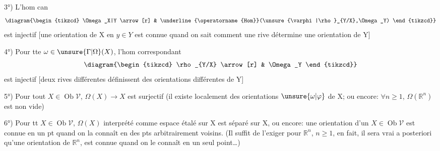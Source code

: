 
3°) L'hom can
\[
\diagram{\begin{tikzcd}
\Omega_X|Y \arrow[r] & \underline{\operatorname{Hom}}(\unsure{\varphi|\rho}_{Y/X},\Omega_Y)
\end{tikzcd}}
\]
est injectif [une orientation de X en $y\in Y$ est connue quand on sait comment  une rive  détermine une orientation de Y]

4°) Pour tte $\omega\in\unsure{\Gamma|\Omega}(X)$, l'hom correspondant
\[
\diagram{\begin{tikzcd}
\rho_{Y/X} \arrow[r] & \Omega_Y
\end{tikzcd}}
\]
est injectif [deux rives différentes définissent des orientations différentes de Y]

5°) Pour tout $X\in\operatorname{Ob}\mathcal V$, $\Omega(X)\to X$ est surjectif (il existe localement des orientations $\unsure{\omega|\varphi}$ de X; ou encore:
$\forall n\geq1$, $\Omega(\mathbb R^n)$ est non vide)

6°) Pour tt $X\in\operatorname{Ob}\mathcal V$, $\Omega(X)$ interprété comme espace étalé sur X est séparé sur X, ou encore:
une orientation d'un $X\in\operatorname{Ob}\mathcal V$ est connue en un pt quand on la connaît en des pts arbitrairement voisins. (Il suffit de l'exiger pour $\mathbb R^n$, $n\geq1$, en fait, il sera vrai a posteriori qu'une orientation de $\mathbb R^n$,  est connue quand on le connaît en un seul point\ldots)

